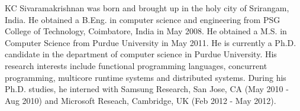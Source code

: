 \begin{vita}
KC Sivaramakrishnan was born and brought up in the holy city of Srirangam,
India. He obtained a B.Eng. in computer science and engineering from PSG
College of Technology, Coimbatore, India in May 2008. He obtained a M.S. in
Computer Science from Purdue University in May 2011. He is currently a Ph.D.
candidate in the department of computer science in Purdue University. His
research interests include functional programming languages, concurrent
programming, multicore runtime systems and distributed systems. During his
Ph.D. studies, he interned with Samsung Research, San Jose, CA (May 2010 - Aug
2010) and Microsoft Reseach, Cambridge, UK (Feb 2012 - May 2012).
\end{vita}
